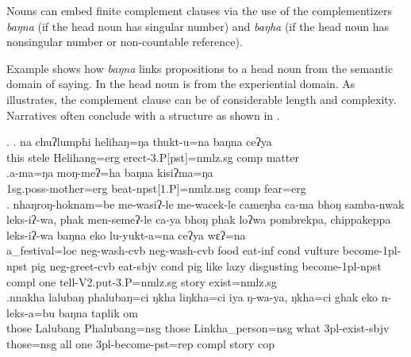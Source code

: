 Nouns can embed finite complement clauses via the use of the complementizers \emph{baŋna} (if the head noun has singular number) and \emph{baŋha} (if the head noun has nonsingular number or non-countable reference). 

Example \Next[a] shows how   \emph{baŋna} links  propositions to a head noun from the semantic domain of saying.  In \Next[b] the head noun is from the experiential domain. As \Next[c] illustrates, the complement clause can be of considerable length and complexity. Narratives often conclude with a structure as shown in \Next[d]. 

\ex. \ag.  na   chuʔlumphi helihaŋ=ŋa  thukt-u=na  baŋna ceʔya\\
this stele Helihang{\sc =erg} erect{\sc -3.P[pst]=nmlz.sg} {\sc comp} matter\\
 
\bg.a-ma=ŋa                moŋ-meʔ=ha                baŋna kisiʔma=ŋa\\
{\sc 1sg.poss-}mother{\sc =erg} beat{\sc -npst[1.P]=nmlz.nsg} {\sc comp} fear{\sc =erg}\\
 
\bg. nhaŋroŋ-hoknam=be    me-wasiʔ-le      me-wacek-le        cameŋba  ca-ma     bhoŋ samba-nwak leks-iʔ-wa,          phak men-semeʔ-le    ca-ya  bhoŋ phak loʔwa pombrekpa,  chippakeppa    leks-iʔ-wa baŋna eko lu-yukt-a=na        ceʔya wɛʔ=na\\
a\_festival{\sc =loc} {\sc neg}-wash{\sc -cvb} {\sc neg}-wash{\sc -cvb} food eat{\sc -inf} {\sc cond} vulture become{\sc -1pl-npst} pig {\sc neg}-greet{\sc -cvb} eat{\sc -sbjv} {\sc cond} pig like lazy disgusting become{\sc -1pl-npst} {\sc compl} one tell{\sc -V2.put-3.P=nmlz.sg} story exist{\sc [3sg]=nmlz.sg}\\
 
\bg.nnakha lalubaŋ phalubaŋ=ci    ŋkha liŋkha=ci      iya            ŋ-wa-ya,        ŋkha=ci ghak eko n-leks-a=bu baŋna taplik om\\
those Lalubang Phalubang{\sc =nsg} those Linkha\_person{\sc =nsg} what {\sc 3pl-}exist{\sc -sbjv} those{\sc =nsg} all one {\sc 3pl-}become{\sc -pst=rep} {\sc compl} story {\sc cop}\\
 

